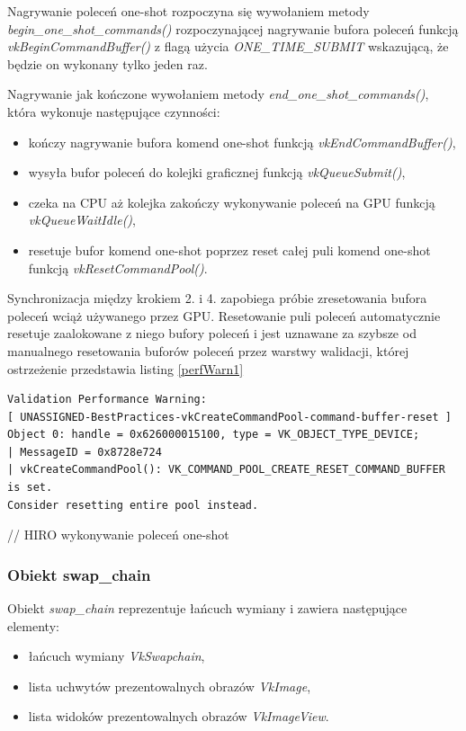 Nagrywanie poleceń one-shot rozpoczyna się wywołaniem metody \textit{begin\_one\_shot\_commands()} rozpoczynającej nagrywanie bufora poleceń funkcją \textit{vkBeginCommandBuffer()} z flagą użycia \textit{ONE\_TIME\_SUBMIT} wskazującą, że będzie on wykonany tylko jeden raz.

Nagrywanie jak kończone wywołaniem metody \textit{end\_one\_shot\_commands()}, która wykonuje następujące czynności:
\begin{itemize}
	\item kończy nagrywanie bufora komend one-shot funkcją \textit{vkEndCommandBuffer()},
	\item wysyła bufor poleceń do kolejki graficznej funkcją \textit{vkQueueSubmit()},
	\item czeka na CPU aż kolejka zakończy wykonywanie poleceń na GPU funkcją \textit{vkQueueWaitIdle()},
	\item resetuje bufor komend one-shot poprzez reset całej puli komend one-shot funkcją \textit{vkResetCommandPool()}.
\end{itemize}
Synchronizacja między krokiem 2. i 4. zapobiega próbie zresetowania bufora poleceń wciąż używanego przez GPU. Resetowanie puli poleceń automatycznie resetuje zaalokowane z niego bufory poleceń i jest uznawane za szybsze od manualnego resetowania buforów poleceń przez warstwy walidacji, której ostrzeżenie przedstawia listing \ref{perfWarn1}
\lstset{language=verbatim}
\begin{lstlisting}[caption={Ostrzeżenie wydajnościowe wyemitowane przez warstwy walidacji},captionpos=b,label={perfWarn1}]
Validation Performance Warning:
[ UNASSIGNED-BestPractices-vkCreateCommandPool-command-buffer-reset ]
Object 0: handle = 0x626000015100, type = VK_OBJECT_TYPE_DEVICE;
| MessageID = 0x8728e724
| vkCreateCommandPool(): VK_COMMAND_POOL_CREATE_RESET_COMMAND_BUFFER is set.
Consider resetting entire pool instead.
\end{lstlisting}

// HIRO wykonywanie poleceń one-shot

\subsubsection{Obiekt swap\_chain}
Obiekt \textit{swap\_chain} reprezentuje łańcuch wymiany i zawiera następujące elementy:
\begin{itemize}
	\item łańcuch wymiany \textit{VkSwapchain},
	\item lista uchwytów prezentowalnych obrazów \textit{VkImage},
	\item lista widoków prezentowalnych obrazów \textit{VkImageView}.
\end{itemize}

